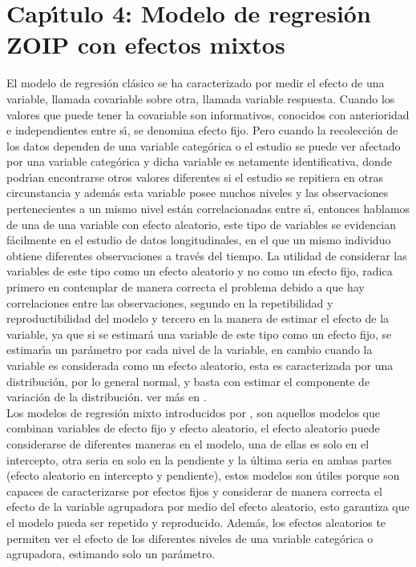 \chapter{Cap\'{\i}tulo 4: Modelo de regresi\'{o}n ZOIP con efectos mixtos}\label{cap4}

El modelo de regresi\'{o}n cl\'{a}sico se ha caracterizado por medir el efecto de una variable, llamada covariable sobre otra, llamada variable respuesta. Cuando los valores que puede tener la covariable son informativos, conocidos con anterioridad e independientes entre s\'{\i}, se denomina efecto fijo. Pero cuando la recolecci\'{o}n de los datos dependen de una variable categ\'{o}rica o el estudio se puede ver afectado por una variable categ\'{o}rica y dicha variable es netamente identificativa, donde podr\'{\i}an encontrarse otros valores diferentes si el estudio se repitiera en otras circunstancia y adem\'{a}s esta variable posee muchos niveles y las observaciones pertenecientes a un mismo nivel est\'{a}n correlacionadas entre s\'{\i}, entonces hablamos de una de una variable con efecto aleatorio, este tipo de variables se evidencian f\'{a}cilmente en el estudio de datos longitudinales, en el que un mismo individuo obtiene diferentes observaciones a trav\'{e}s del tiempo. La utilidad de considerar las variables de este tipo como un efecto aleatorio y no como un efecto fijo, radica primero en contemplar de manera correcta el problema debido a que hay correlaciones entre las observaciones, segundo en la repetibilidad y reproductibilidad del modelo y tercero en la manera de estimar el efecto de la variable, ya que si se estimar\'{a} una variable de este tipo como un efecto fijo, se estimar\'{\i}a un par\'{a}metro por cada nivel de la variable, en cambio cuando la variable es considerada como un efecto aleatorio, esta es caracterizada por una distribuci\'{o}n, por lo general normal, y basta con estimar el componente de variaci\'{o}n de la distribuci\'{o}n. ver m\'{a}s en \cite{Seoane1}.\\

Los modelos de regresi\'{o}n mixto introducidos por \cite{Laird1}, son aquellos modelos que combinan variables de efecto fijo y efecto aleatorio, el efecto aleatorio puede considerarse de diferentes maneras en el modelo, una de ellas es solo en el intercepto, otra seria en solo en la pendiente y la \'{u}ltima seria en ambas partes (efecto aleatorio en intercepto y pendiente), estos modelos son \'{u}tiles porque son capaces de caracterizarse por efectos fijos y considerar de manera correcta el efecto de la variable agrupadora por medio del efecto aleatorio, esto garantiza que el modelo pueda ser repetido y reproducido. Adem\'{a}s, los efectos aleatorios te permiten ver el efecto de los diferentes niveles de una variable categ\'{o}rica o agrupadora, estimando solo un par\'{a}metro.\\

